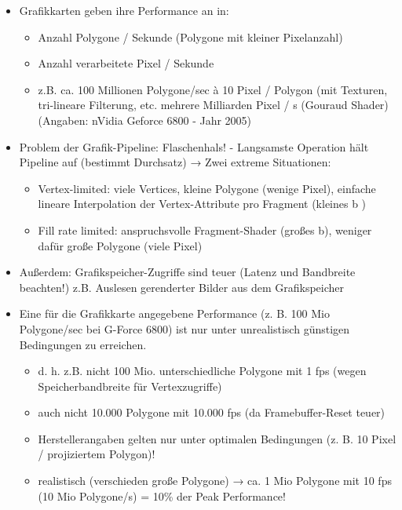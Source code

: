 \documentclass[10pt,landscape]{article}
\begin{document}
\begin{multicols}{3}
\begin{itemize}
  \item Grafikkarten geben ihre Performance an in:
        \begin{itemize}
          \item  Anzahl Polygone / Sekunde (Polygone mit kleiner Pixelanzahl)
          \item Anzahl verarbeitete Pixel / Sekunde
          \item  z.B. ca. 100 Millionen Polygone/sec à 10 Pixel / Polygon (mit Texturen, tri-lineare Filterung, etc. mehrere Milliarden Pixel / s (Gouraud Shader) (Angaben: nVidia Geforce 6800 - Jahr 2005)
        \end{itemize}
  \item Problem der Grafik-Pipeline: Flaschenhals! - Langsamste Operation hält Pipeline auf (bestimmt Durchsatz) → Zwei extreme Situationen:
        \begin{itemize}
          \item  Vertex-limited: viele Vertices, kleine Polygone (wenige Pixel), einfache lineare Interpolation der Vertex-Attribute pro Fragment (kleines b )
          \item  Fill rate limited: anspruchsvolle Fragment-Shader (großes b), weniger dafür große Polygone (viele Pixel)
        \end{itemize}
  \item Außerdem: Grafikspeicher-Zugriffe sind teuer (Latenz und Bandbreite beachten!) z.B. Auslesen gerenderter Bilder aus dem Grafikspeicher
  \item Eine für die Grafikkarte angegebene Performance (z. B. 100 Mio Polygone/sec bei G-Force 6800) ist nur unter unrealistisch günstigen Bedingungen zu erreichen.
        \begin{itemize}
          \item  d. h. z.B. nicht 100 Mio. unterschiedliche Polygone mit 1 fps (wegen Speicherbandbreite für Vertexzugriffe)
          \item  auch nicht 10.000 Polygone mit 10.000 fps (da Framebuffer-Reset teuer)
          \item  Herstellerangaben gelten nur unter optimalen Bedingungen (z. B. 10 Pixel / projiziertem Polygon)!
          \item  realistisch (verschieden große Polygone) → ca. 1 Mio Polygone mit 10 fps (10 Mio Polygone/s) = 10\% der Peak Performance!
        \end{itemize}
\end{itemize}


\end{multicols}
\end{document}
